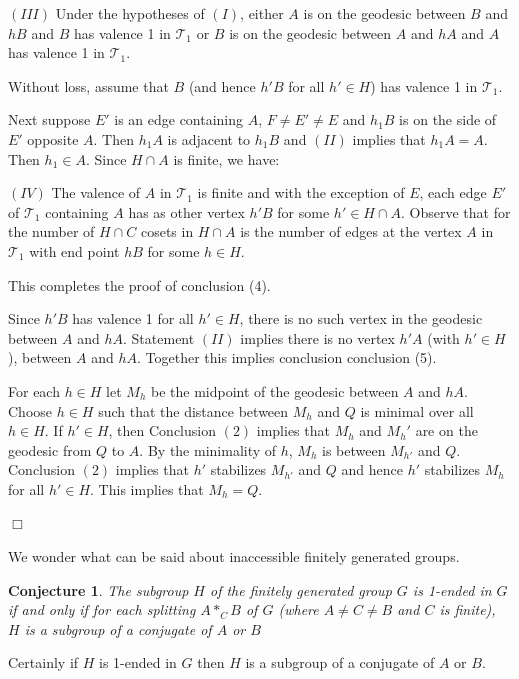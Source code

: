 \documentclass[12pt]{article}
\newtheorem{conjecture}[theorem]{Conjecture}
\newenvironment{proof}{\addvspace{12pt}\noindent{\bf Proof:}}{
$\Box$\par\addvspace{12pt}}
\begin{document}
\begin{proof}
$(III)$ Under the hypotheses of $(I)$, either $A$ is on the geodesic between $B$ and $hB$ and $B$ has valence 1 in $\mathcal T_1$ or $B$ is on the geodesic between $A$ and $hA$ and $A$ has valence 1 in $\mathcal T_1$. 

Without loss, assume that $B$ (and hence $h'B$ for all $h'\in H$) has valence 1 in $\mathcal T_1$.

\medskip

Next suppose $E'$ is an edge containing $A$, $F\ne E'\ne E$ and $h_1B$ is on the side of $E'$ opposite $A$. Then $h_1A$ is adjacent to $h_1B$ and $(II)$ implies that $h_1A=A$. Then $h_1\in A$. Since $H\cap A$ is finite, we have: 

\medskip

$(IV)$ The valence of $A$ in $\mathcal T_1$ is finite and with the exception of $E$, each edge $E'$ of $\mathcal T_1$ containing $A$ has as other vertex $h'B$ for some $h'\in H\cap A$. Observe that for the number of $H\cap C$ cosets in  $H\cap A$ is the number of edges at the vertex $A$ in $\mathcal T_1$ with end point $hB$ for some $h\in H$. 

\medskip

This completes the proof of conclusion (4).

Since $h'B$ has valence 1 for all $h'\in H$, there is no such vertex in the geodesic between $A$ and $hA$. Statement $(II)$ implies there is no vertex $h'A$ (with $h'\in H$), between $A$ and $hA$. Together this implies conclusion conclusion (5). 

For each $h\in H$ let $M_h$ be the midpoint of the geodesic between $A$ and $hA$. Choose $h\in H$ such that the distance between $M_h$ and $Q$ is minimal over all $h\in H$. If $h'\in H$, then  
Conclusion $(2)$ implies that $M_h$ and $M_h'$ are on the geodesic from  $Q$ to $A$. By the minimality of $h$, $M_{h}$ is between $M_{h'}$ and $Q$. Conclusion $(2)$ implies that $h'$ stabilizes $M_{h'}$ and $Q$ and hence $h'$ stabilizes $M_h$ for all $h'\in H$. This implies that $M_h=Q$. 
\end{proof}

We wonder what can be said about inaccessible finitely generated groups. 

\begin{conjecture}
The subgroup $H$ of the finitely generated group $G$ is 1-ended in $G$ if and only if for each splitting $A\ast_CB$ of $G$ (where $A\ne C\ne B$ and $C$ is finite), $H$ is a subgroup of a conjugate of $A$ or $B$
\end{conjecture}
Certainly if $H$ is 1-ended in $G$ then $H$ is a subgroup of a conjugate of $A$ or $B$. 
\end{document}
